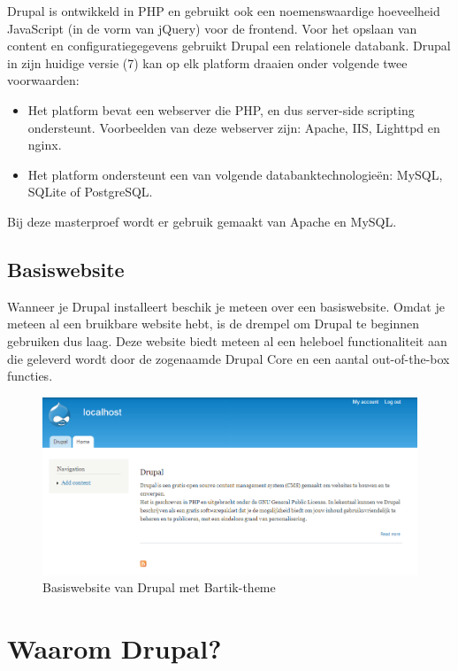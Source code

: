 Drupal is ontwikkeld in PHP en gebruikt ook een noemenswaardige hoeveelheid JavaScript (in de vorm van jQuery) voor de frontend. Voor het opslaan van content en configuratiegegevens gebruikt Drupal een relationele databank. Drupal in zijn huidige versie (7) kan op elk platform draaien onder volgende twee voorwaarden:
\begin{itemize}
\item Het platform bevat een webserver die PHP, en dus server-side scripting ondersteunt. Voorbeelden van deze webserver zijn:  Apache, IIS, Lighttpd en nginx.
\item Het platform ondersteunt een van volgende databanktechnologie\"{e}n: MySQL, SQLite of PostgreSQL.
\end{itemize}
Bij deze masterproef wordt er gebruik gemaakt van Apache en MySQL.

\subsection{Basiswebsite}

Wanneer je Drupal installeert beschik je meteen over een basiswebsite. Omdat je meteen al een bruikbare website hebt, is de drempel om Drupal te beginnen gebruiken dus laag. Deze website biedt meteen al een heleboel functionaliteit aan die geleverd wordt door de zogenaamde Drupal Core en een aantal out-of-the-box functies.
\begin{figure}[h]
\begin{center}
\includegraphics[keepaspectratio,width=1\textwidth]{fig/drupalBasiswebsite}
\vspace{-40pt}
\caption{Basiswebsite van Drupal met Bartik-theme}
\end{center}
\end{figure}

\section{Waarom Drupal?}

